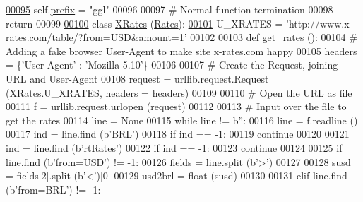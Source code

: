 \begin{DoxyCode}
{{\hyperlink{classrates_1_1_google_ada5de8700ad571d0ab819fa0163d6bbe}{00095}         self.\hyperlink{classrates_1_1_google_ada5de8700ad571d0ab819fa0163d6bbe}{prefix} = \textcolor{stringliteral}{"ggl"}
00096                 
00097         \textcolor{comment}{# Normal function termination}
00098         \textcolor{keywordflow}{return}
00099             
\hyperlink{classrates_1_1_x_rates}{00100} \textcolor{keyword}{class }\hyperlink{classrates_1_1_x_rates}{XRates} (\hyperlink{classrates_1_1_rates}{Rates}):
\hyperlink{classrates_1_1_x_rates_ab3bd64c08e6503f0d76c9f73dc38fa25}{00101}     U\_XRATES = \textcolor{stringliteral}{'http://www.x-rates.com/table/?from=USD&amount=1'}
00102 
\hyperlink{classrates_1_1_x_rates_a034e274f1bf0a2509af2621eb27c7cce}{00103}     \textcolor{keyword}{def }\hyperlink{classrates_1_1_x_rates_a034e274f1bf0a2509af2621eb27c7cce}{get\_rates} ():        
00104         \textcolor{comment}{# Adding a fake browser User-Agent to make site x-rates.com happy}
00105         headers = \{\textcolor{stringliteral}{'User-Agent'} : \textcolor{stringliteral}{'Mozilla 5.10'}\}
00106             
00107         \textcolor{comment}{# Create the Request, joining URL and User-Agent}
00108         request = urllib.request.Request (XRates.U\_XRATES, headers = headers)
00109     
00110         \textcolor{comment}{# Open the URL as file}
00111         f = urllib.request.urlopen (request)
00112         
00113         \textcolor{comment}{# Input over the file to get the rates}
00114         line = \textcolor{keywordtype}{None}
00115         \textcolor{keywordflow}{while} line != b\textcolor{stringliteral}{''}:
00116             line = f.readline ()
00117             ind = line.find (b\textcolor{stringliteral}{'BRL'})
00118             \textcolor{keywordflow}{if} ind == -1:
00119                 \textcolor{keywordflow}{continue} 
00120             
00121             ind = line.find (b\textcolor{stringliteral}{'rtRates'})
00122             \textcolor{keywordflow}{if} ind == -1:
00123                 \textcolor{keywordflow}{continue} 
00124                     
00125             \textcolor{keywordflow}{if} line.find (b\textcolor{stringliteral}{'from=USD'}) != -1:
00126                 fields = line.split (b\textcolor{stringliteral}{'>'})
00127                 
00128                 susd = fields[2].split (b\textcolor{stringliteral}{'<'})[0]
00129                 usd2brl = float (susd)
00130             
00131             \textcolor{keywordflow}{elif} line.find (b\textcolor{stringliteral}{'from=BRL'}) != -1:
}}
\end{DoxyCode}
